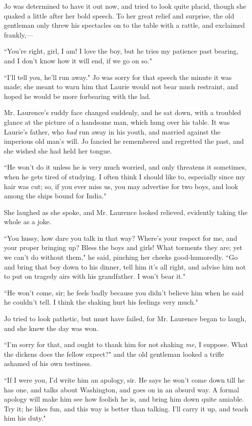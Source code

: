 Jo was determined to have it out now, and tried to look quite placid,
though she quaked a little after her bold speech. To her great relief
and surprise, the old gentleman only threw his spectacles on to the
table with a rattle, and exclaimed frankly,---

``You're right, girl, I am! I love the boy, but he tries
my patience past bearing, and I don't know how it will
end, if we go on so."

``I'll tell you, he'll run away." Jo was
sorry for that speech the minute it was made; she meant to warn him that
Laurie would not bear much restraint, and hoped he would be more
forbearing with the lad.

Mr. Laurence's ruddy face changed suddenly, and he sat
down, with a troubled glance at the picture of a handsome man, which
hung over his table. It was Laurie's father, who
\emph{had} run away in his youth, and married against the imperious old
man's will. Jo fancied he remembered and regretted the
past, and she wished she had held her tongue.

``He won't do it unless he is very much worried, and only
threatens it sometimes, when he gets tired of studying. I often think I
should like to, especially since my hair was cut; so, if you ever miss
us, you may advertise for two boys, and look among the ships bound for
India."

She laughed as she spoke, and Mr. Laurence looked relieved, evidently
taking the whole as a joke.

``You hussy, how dare you talk in that way? Where's your
respect for me, and your proper bringing up? Bless the boys and girls!
What torments they are; yet we can't do without them,"
he said, pinching her cheeks good-humoredly. ``Go and bring that boy down
to his dinner, tell him it's all right, and advise him
not to put on tragedy airs with his grandfather. I won't
bear it."

``He won't come, sir; he feels badly because you
didn't believe him when he said he
couldn't tell. I think the shaking hurt his feelings
very much."

Jo tried to look pathetic, but must have failed, for Mr. Laurence began
to laugh, and she knew the day was won.

``I'm sorry for that, and ought to thank him for not
shaking \emph{me,} I suppose. What the dickens does the fellow expect?"
and the old gentleman looked a trifle ashamed of his own testiness.

``If I were you, I'd write him an apology, sir. He says
he won't come down till he has one, and talks about
Washington, and goes on in an absurd way. A formal apology will make him
see how foolish he is, and bring him down quite amiable. Try it; he
likes fun, and this way is better than talking. I'll
carry it up, and teach him his duty."

